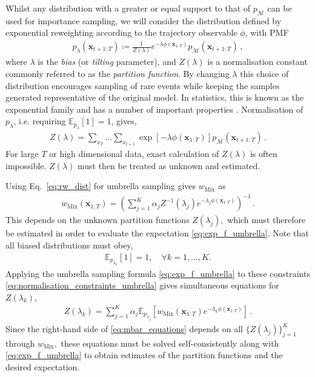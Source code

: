 \documentclass{article}
\newcommand{\realtraj}{\mathbf{x}}
\newcommand{\realtoken}{x}
\newcommand{\obs}{\phi}
\newcommand{\bias}{\lambda}
\newcommand{\EV}{\mathbb{E}}
\newcommand{\pdf}{p}
\newcommand{\pdfmodel}{p_{\mathcal{M}}}
\begin{document}
Whilst any distribution with a greater or equal support to that of $\pdfmodel$ can be used for importance sampling, we will consider the distribution defined by exponential reweighting according to the trajectory observable $\phi$, with PMF
\begin{align}
    \pdf_\bias(\realtraj_{t+1:T})
    \coloneqq
    \frac{1}{Z(\lambda)} e^{-\lambda \obs(\realtraj_{1:T})} \pdfmodel(\realtraj_{t+1:T}) \,,
    \label{eq:rw_dist}
\end{align}
where $\bias$ is the \textit{bias} (or \textit{tilting} parameter), and $Z(\bias)$ is a normalisation constant commonly referred to as the \textit{partition function}.
By changing $\bias$ this choice of distribution encourages sampling of rare events while keeping the samples generated representative of the original model. In
statistics, this is known as the exponential family and has a number of important properties \cite{murphy2022probabilistic}.
Normalisation of $\pdf_\bias$, i.e. requiring $\EV_{\pdf_\bias}[1] = 1$, gives,
\begin{align}
    Z(\bias)
    =
    \sum_{\realtoken_{T}} \dots \sum_{\realtoken_{t+1}}
    \exp[- \lambda \obs(\realtraj_{1:T})]\pdfmodel(\realtraj_{t+1:T})
    \,.
\end{align}
For large $T$ or high dimensional data, exact calculation of $Z(\bias)$ is often impossible. $Z(\bias)$ must then be treated as unknown and estimated.

Using Eq.~\eqref{eq:rw_dist} for umbrella sampling gives $w_{\text{Mix}}$ as
\begin{align}
    w_{\text{Mix}}(\realtraj_{1:T}) = \left(\sum_{j=1}^K \alpha_j Z^{-1}(\bias_j) e^{-\bias_j \obs(\realtraj_{1:T})}\right)^{-1} \,.
\end{align}
This depends on the unknown partition functions $Z(\bias_j),$ which must therefore be estimated in order to evaluate the expectation \eqref{eq:exp_f_umbrella}. Note that all biased distributions must obey,
\begin{align}
    \EV_{\pdf_{\bias_k}}[1] = 1, \quad \forall k = 1, \dots, K.
    \label{eq:normalisation_constraints_umbrella}
\end{align}
Applying the umbrella sampling formula \eqref{eq:exp_f_umbrella} to these constraints \eqref{eq:normalisation_constraints_umbrella} gives simultaneous equations for $Z(\bias_k),$
\begin{align}
    Z(\bias_k)
    =
    \sum_{j=1}^K
    \alpha_j \EV_{\pdf_{\bias_j}}
    \left[
        w_{\text{Mix}}(\realtraj_{1:T}) e^{-\bias_k \obs(\realtraj_{1:T})}
        \right]
    \, .
    \label{eq:mbar_equations}
\end{align}
Since the right-hand side of \eqref{eq:mbar_equations} depends on all $\{ Z(\bias_j) \}_{j=1}^K$ through $w_{\text{Mix}},$ these equations must be solved self-consistently along with \eqref{eq:exp_f_umbrella} to obtain estimates of the partition functions and the desired expectation.
\end{document}

